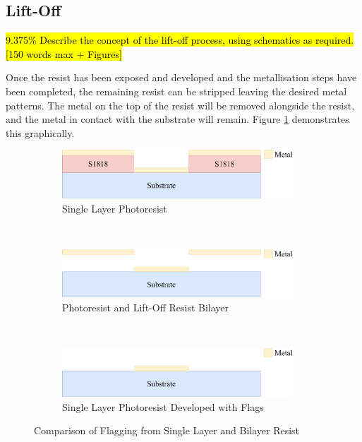 \subsection{Lift-Off}
\label{sec:fab:liftoff}

\hl{9.375\% Describe the concept of the lift-off process, using schematics as required. [150 words max + Figures]}

Once the resist has been exposed and developed and the metallisation steps have been completed, the remaining resist can be stripped leaving the desired metal patterns. The metal on the top of the resist will be removed alongside the resist, and the metal in contact with the substrate will remain. Figure \ref{fig:lift-off} demonstrates this graphically.

\begin{figure}[!htb]
  \centering
  \begin{subfigure}[t]{0.5\textwidth}
      \centering
      \includegraphics[width=0.95\textwidth]{Figures/angus_bruce/lift_off_microandnano1.pdf}
      \caption{Single Layer Photoresist}
  \end{subfigure}%
  ~
  \begin{subfigure}[t]{0.5\textwidth}
      \centering
      \includegraphics[width=0.95\textwidth]{Figures/angus_bruce/lift_off_microandnano2.pdf}
      \caption{Photoresist and Lift-Off Resist Bilayer}
  \end{subfigure}
  ~
  \begin{subfigure}[t]{0.5\textwidth}
      \centering
      \includegraphics[width=0.95\textwidth]{Figures/angus_bruce/lift_off_microandnano3.pdf}
      \caption{Single Layer Photoresist Developed with Flags}
  \end{subfigure}
  \caption{Comparison of Flagging from Single Layer and Bilayer Resist}
  \label{fig:lift-off}
\end{figure}

